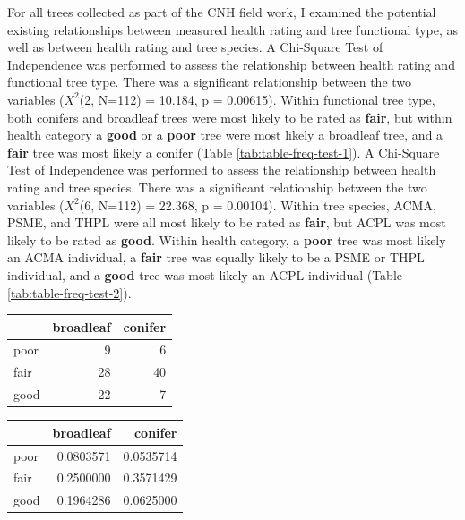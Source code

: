 \documentclass[12pt,twoside]{reedthesis}
\begin{document}
For all trees collected as part of the CNH field work, I examined the
potential existing relationships between measured health rating and tree
functional type, as well as between health rating and tree species. A
Chi-Square Test of Independence was performed to assess the relationship
between health rating and functional tree type. There was a significant
relationship between the two variables (\(X^2\)(2, N=112) = 10.184, p =
0.00615). Within functional tree type, both conifers and broadleaf trees
were most likely to be rated as \textbf{fair}, but within health category a
\textbf{good} or a \textbf{poor} tree were most likely a broadleaf tree, and a
\textbf{fair} tree was most likely a conifer (Table
\ref{tab:table-freq-test-1}). A Chi-Square Test of Independence was
performed to assess the relationship between health rating and tree
species. There was a significant relationship between the two variables
(\(X^2\)(6, N=112) = 22.368, p = 0.00104). Within tree species, ACMA,
PSME, and THPL were all most likely to be rated as \textbf{fair}, but ACPL
was most likely to be rated as \textbf{good}. Within health category, a
\textbf{poor} tree was most likely an ACMA individual, a \textbf{fair} tree was
equally likely to be a PSME or THPL individual, and a \textbf{good} tree was
most likely an ACPL individual (Table \ref{tab:table-freq-test-2}).
\begin{table}
\caption{\label{tab:table-freq-test-1}Frequency and probability tables of functional tree type and health rating for CNH trees. There is a statistically significant relationship between the two variables ($X^2$(2, N=112) = 10.184, p = 0.00615)}
\begin{longtable}[t]{lrr}
\toprule
  & broadleaf & conifer\\
\midrule
poor & 9 & 6\\
fair & 28 & 40\\
good & 22 & 7\\
\bottomrule
\end{longtable}
\begin{longtable}[t]{lrr}
\toprule
  & broadleaf & conifer\\
\midrule
poor & 0.0803571 & 0.0535714\\
fair & 0.2500000 & 0.3571429\\
good & 0.1964286 & 0.0625000\\
\bottomrule
\end{longtable}
\end{table}
\end{document}
